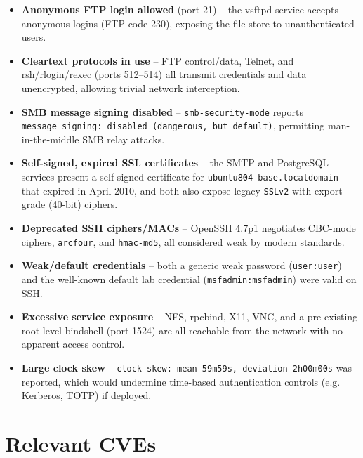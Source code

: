 \documentclass[11pt,a4paper]{article}
\begin{document}
\begin{itemize}[leftmargin=1.4em, itemsep=0.5em]
\item \textbf{Anonymous FTP login allowed} (port 21) -- the vsftpd service accepts anonymous logins (FTP code 230), exposing the file store to unauthenticated users.
\item \textbf{Cleartext protocols in use} -- FTP control/data, Telnet, and rsh/rlogin/rexec (ports 512--514) all transmit credentials and data unencrypted, allowing trivial network interception.
\item \textbf{SMB message signing disabled} -- \texttt{smb-security-mode} reports \texttt{message\_signing: disabled (dangerous, but default)}, permitting man-in-the-middle SMB relay attacks.
\item \textbf{Self-signed, expired SSL certificates} -- the SMTP and PostgreSQL services present a self-signed certificate for \texttt{ubuntu804-base.localdomain} that expired in April 2010, and both also expose legacy \texttt{SSLv2} with export-grade (40-bit) ciphers.
\item \textbf{Deprecated SSH ciphers/MACs} -- OpenSSH 4.7p1 negotiates CBC-mode ciphers, \texttt{arcfour}, and \texttt{hmac-md5}, all considered weak by modern standards.
\item \textbf{Weak/default credentials} -- both a generic weak password (\texttt{user:user}) and the well-known default lab credential (\texttt{msfadmin:msfadmin}) were valid on SSH.
\item \textbf{Excessive service exposure} -- NFS, rpcbind, X11, VNC, and a pre-existing root-level bindshell (port 1524) are all reachable from the network with no apparent access control.
\item \textbf{Large clock skew} -- \texttt{clock-skew: mean 59m59s, deviation 2h00m00s} was reported, which would undermine time-based authentication controls (e.g. Kerberos, TOTP) if deployed.
\end{itemize}

\section{Relevant CVEs}
\end{document}
